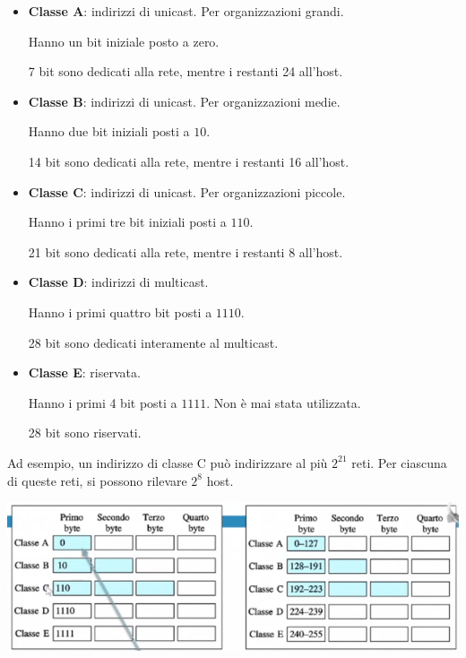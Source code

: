         \begin{itemize}
            \item 
                \textbf{Classe A}: indirizzi di unicast. Per organizzazioni grandi.
                
                Hanno un bit iniziale posto a zero. 
                
                7 bit sono dedicati alla rete, mentre i restanti 24 all'host.
            
            \item 
                \textbf{Classe B}: indirizzi di unicast. Per organizzazioni medie.
                
                Hanno due bit iniziali posti a $10$.
                
                14 bit sono dedicati alla rete, mentre i restanti 16 all'host.
                
            \item 
                \textbf{Classe C}: indirizzi di unicast. Per organizzazioni piccole.
                
                Hanno i primi tre bit iniziali posti a $110$.
                
                21 bit sono dedicati alla rete, mentre i restanti 8 all'host.
            
            \item 
                \textbf{Classe D}: indirizzi di multicast. 
                
                Hanno i primi quattro bit posti a $1110$.
                
                28 bit sono dedicati interamente al multicast.
            
            \item 
                \textbf{Classe E}: riservata. 
                
                Hanno i primi 4 bit posti a $1111$. Non è mai stata utilizzata.
                
                28 bit sono riservati.
        \end{itemize}
        
        Ad esempio, un indirizzo di classe C può indirizzare al più $2^21$ reti. Per ciascuna di queste reti, si possono rilevare $2^8$ host.
        
        \begin{center}
            \includegraphics[scale=0.5]{images/Classi-IP.png}
        \end{center}
    
